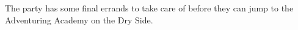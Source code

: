 The party has some final errands to take care of before they can jump to the Adventuring Academy on the Dry Side.
